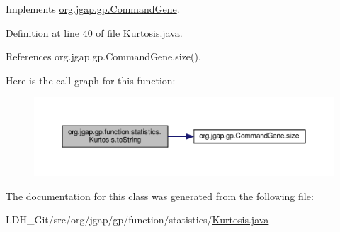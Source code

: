 Implements \hyperlink{classorg_1_1jgap_1_1gp_1_1_command_gene_a236141d99059da808afe7a9217e411c7}{org.\-jgap.\-gp.\-Command\-Gene}.



Definition at line 40 of file Kurtosis.\-java.



References org.\-jgap.\-gp.\-Command\-Gene.\-size().



Here is the call graph for this function\-:
\nopagebreak
\begin{figure}[H]
\begin{center}
\leavevmode
\includegraphics[width=350pt]{classorg_1_1jgap_1_1gp_1_1function_1_1statistics_1_1_kurtosis_a809015eb2a9e8c95576b2d05d7ed6877_cgraph}
\end{center}
\end{figure}




The documentation for this class was generated from the following file\-:\begin{DoxyCompactItemize}
\item 
L\-D\-H\-\_\-\-Git/src/org/jgap/gp/function/statistics/\hyperlink{_kurtosis_8java}{Kurtosis.\-java}\end{DoxyCompactItemize}
